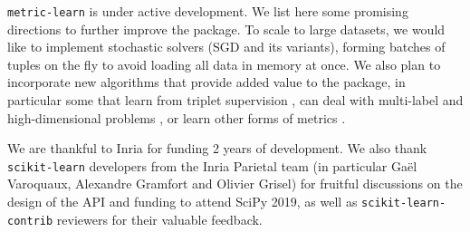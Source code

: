 \documentclass[twoside,11pt]{article}
\newcommand{\aurelien}[1]{\todo[inline,caption={},color=orange!40]{{\it Aurelien:~}#1}}
\begin{document}
\texttt{metric-learn} is under active development. We list here some promising directions to further improve the package. To scale to large datasets, we would like to implement stochastic solvers (SGD and its variants), forming batches of tuples on the fly to avoid loading all data in memory at once. %
We also plan to incorporate new algorithms that provide added value to the package, in particular some that learn from triplet supervision \citep{Schultz2003a}, can deal with multi-label \citep{liu15} and high-dimensional problems \citep{Liu19}, or learn other forms of metrics \citep[e.g., nonlinear ones, bilinear similarities, and multiple local metrics, see][]{Bellet15}.

\acks

We are thankful to Inria for funding 2 years of development. We also thank \texttt{scikit-learn} developers from the Inria Parietal team (in particular Gaël Varoquaux, Alexandre Gramfort and Olivier Grisel) for fruitful discussions on the design of the API and funding to attend SciPy 2019, as well as \texttt{scikit-learn-contrib} reviewers for their valuable feedback.





\end{document}
